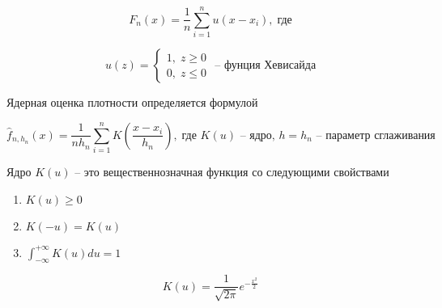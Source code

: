 \documentclass[12pt]{article}
\begin{document}
\begin{equation} 
    \hat{F_n}(x) = \frac{1}{n} \sum_{i=1}^{n}{u(x - x_i)}, \; \label{eq:1} \text{где}
\end{equation}

\begin{equation} 
    u(z) = 
    \begin{cases}
        1, \; z \geq 0 \\
        0, \; z \leq 0
    \end{cases}
    \text{ – фунция Хевисайда} 
    \label{eq:2}
\end{equation}

Ядерная оценка плотности определяется формулой

\begin{equation}
    \hat{f}_{n, h_n}(x)=\frac{1}{nh_n} \sum_{i=1}^{n}{K \left(\frac{x - x_i}{h_n}\right)}, \; \label{eq:3} \text{где $K(u)$ – ядро, $h = h_n$ – параметр сглаживания}
\end{equation}

Ядро $K(u)$  – это вещественнозначная функция со следующими свойствами

\begin{enumerate}
    \item $K(u) \geq 0$
    \item $K(-u) = K(u)$
    \item $\displaystyle \int_{-\infty}^{+\infty}{K(u)du} = 1$
\end{enumerate}

\begin{equation}
    K(u) = \frac{1}{\sqrt{2\pi}}e^{-\frac{x^2}{2}} \label{eq:4}
\end{equation}

\end{document}
